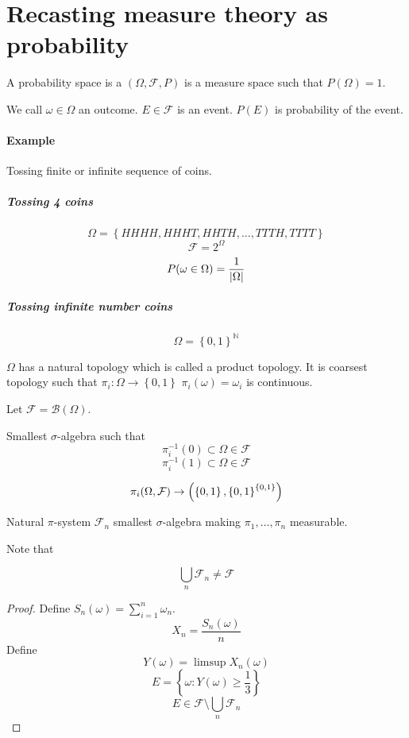\section{Recasting measure theory as probability}
\begin{definition}
	A probability space is a $(\Omega, \mathcal{F}, P)$ is a measure space such that $P(\Omega) = 1$.
	
	We call $\omega \in \Omega$ an outcome. $E\in \mathcal{F}$ is an event. $P(E)$ is probability of the event.
\end{definition}

\paragraph{Example}
Tossing finite or infinite sequence of coins.


\subparagraph{Tossing 4 coins}
$$\Omega = \left\{ HHHH, HHHT, HHTH, \dots, TTTH, TTTT \right\}$$
$$\mathcal{F} = 2^\Omega$$
$$P(\omega \in \Omega) = \frac{1}{\abs{\Omega}}$$
	
\subparagraph{Tossing infinite number coins}
$$\Omega = \left\{ 0,1 \right\}^{\mathbb{N}}$$


$\Omega$ has a natural topology which is called a product topology. It is coarsest topology such that $\pi_i: \Omega \to \left\{ 0,1 \right\}$ $\pi_i(\omega) =\omega_i$ is continuous. 

Let $\mathcal{F} = \mathcal{B}(\Omega)$.

Smallest $\sigma$-algebra such that
$$\pi_i^{-1}(0) \subset \Omega \in \mathcal{F} $$
$$\pi_i^{-1}(1) \subset \Omega \in \mathcal{F} $$

$$\pi_i (\Omega, \mathcal{F} ) \to \qty(\left\{ 0,1 \right\}, \left\{ 0,1 \right\}^{\left\{ 0,1 \right\}})$$

Natural $\pi$-system $\mathcal{F}_n$ smallest $\sigma$-algebra making $\pi_1, \dots, \pi_n$ measurable.

Note that
\begin{prop}
	
	$$\bigcup_n \mathcal{F}_n \neq \mathcal{F} $$
	\begin{proof}
		
		Define $S_n(\omega) = \sum_{i=1}^n \omega_n$. 
		$$X_n = \frac{S_n(\omega)}{n}$$
		Define
		$$Y(\omega) = \limsup X_n(\omega)$$
		$$E = \left\{ \omega : Y(\omega) \geq \frac{1}{3} \right\}$$
		$$E \in \mathcal{F} \setminus \bigcup_n \mathcal{F}_n$$
	\end{proof}
\end{prop}


